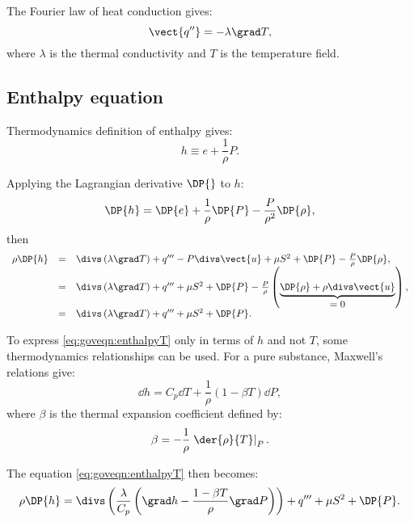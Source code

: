 The Fourier law of heat conduction gives:
\begin{equation}
 \displaystyle \vect{q''}=-\lambda \grad T,
\end{equation}
where $\lambda$ is the thermal conductivity and $T$ is the temperature field.

\subsection{Enthalpy equation}

Thermodynamics definition of enthalpy gives:
\begin{equation}
 h \equiv e+ \dfrac{1}{\rho} P.
\end{equation}

Applying the Lagrangian derivative $\DP{}$ to $h$:
\begin{equation}
 \DP{h}=\DP{e}+\frac{1}{\rho}\DP{P}-\frac{P}{\rho^2}\DP{\rho},
\end{equation}
%
then
\begin{equation}\label{eq:goveqn:enthalpyT}
\begin{array}{r c l}
  \rho \DP{h} &=& \divs \left( \lambda \grad T \right) +q'''-P\divs \vect{u} + \mu S^2 + \DP{P} -\frac{P}{\rho}\DP{\rho}, \\
   &=& \divs \left( \lambda \grad T \right) +q''' + \mu  S^2 + \DP{P} - \frac{P}{\rho} \left(\underbrace{\DP{\rho} + \rho \divs \vect{u}}_{\displaystyle =0} \right), \\
   &=& \divs \left( \lambda \grad T \right) +q''' + \mu  S^2 + \DP{P}.
\end{array}
\end{equation}

To express \eqref{eq:goveqn:enthalpyT} only in terms of $h$ and not $T$, some thermodynamics relationships can be used.
For a pure substance, Maxwell's relations give:
%
\begin{equation}\label{eq:goveqn:dh_dt_dp}
  \dd h=C_p \dd T + \frac{1}{\rho} \left( 1-\beta T \right)\dd P,
\end{equation}
%
where $\beta$ is the thermal expansion coefficient defined by:
\begin{equation}
 \beta= -\frac{1}{\rho}  \left.\der{\rho}{T}\right|_P.
\end{equation}

The equation \eqref{eq:goveqn:enthalpyT} then becomes:
\begin{equation}\label{eq:goveqn:enthalpyH}
 \rho \DP{h} = \divs \left( \dfrac{\lambda}{C_p} \left(\grad h -\dfrac{1-\beta T }{\rho}\grad P\right)\right) +q''' + \mu S^2 + \DP{P}.
\end{equation}

